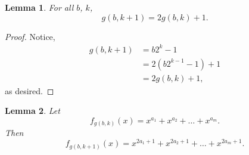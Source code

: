 \documentclass[a4paper]{article}
\newtheorem{lemma}{Lemma}
\begin{document}
	\begin{lemma}
		For all $b$, $k$,
		\begin{equation*}
			g(b,k+1) = 2g(b,k) + 1.
		\end{equation*}
	\end{lemma}
	\begin{proof}
		Notice,
		\begin{align*}
			g(b,k+1) &= b 2^{k} - 1 \\
				&= 2\left(b 2^{k-1} - 1\right) + 1 \\
				&= 2g(b,k) + 1,
		\end{align*}
		as desired.
	\end{proof}
	\begin{lemma}
		Let
		\begin{equation*}
			f_{g(b,k)}(x) = x^{a_1} + x^{a_2} + \dots + x^{a_m}.
		\end{equation*}
		Then
		\begin{equation*}
			f_{g(b,k+1)}(x) = x^{2a_1 + 1} + x^{2a_2 + 1} + \dots + x^{2a_m + 1}.
		\end{equation*}
	\end{lemma}
\end{document}
